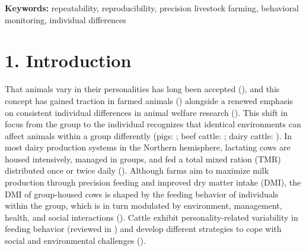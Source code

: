 \documentclass[
]{article}
\begin{document}
\textbf{Keywords:} repeatability, reproducibility, precision livestock
farming, behavioral monitoring, individual differences

\section{1. Introduction}\label{introduction}

That animals vary in their personalities has long been accepted
(), and this concept has gained
traction in farmed animals () alongside a renewed emphasis on consistent individual
differences in animal welfare research
(). This shift in
focus from the group to the individual recognizes that identical
environments can affect animals within a group differently (pigs:
; beef
cattle: ;
dairy cattle: ). In most
dairy production systems in the Northern hemisphere, lactating cows are
housed intensively, managed in groups, and fed a total mixed ration
(TMR) distributed once or twice daily
(). Although farms aim
to maximize milk production through precision feeding and improved dry
matter intake (DMI), the DMI of group-housed cows is shaped by the
feeding behavior of individuals within the group, which is in turn
modulated by environment, management, health, and social interactions
(). Cattle
exhibit personality-related variability in feeding behavior (reviewed in
) and develop
different strategies to cope with social and environmental challenges
().
\end{document}
